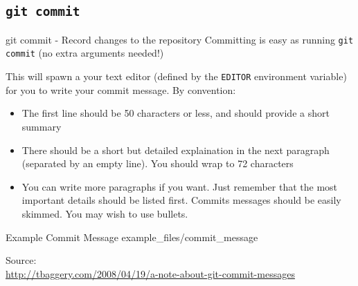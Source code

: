 \documentclass[aspectratio=43]{beamer}
\begin{document}
\subsection{\texttt{git commit}}

\begin{frame}{git commit - Record changes to the repository}
    Committing is easy as running \texttt{git commit} (no extra arguments
    needed!)

    This will spawn a your text editor (defined by the
    \texttt{\textdollar{}EDITOR} environment variable) for you to write your
    commit message. By convention:

    \begin{itemize}
    \item The first line should be 50 characters or less, and should
        provide a short summary
    \item There should be a short but detailed explaination in the next
        paragraph (separated by an empty line). You should wrap to 72
        characters
    \item You can write more paragraphs if you want. Just remember that
        the most important details should be listed first. Commits
        messages should be easily skimmed. You may wish to use bullets.
    \end{itemize}
\end{frame}

\begin{frame}{Example Commit Message}
        {example_files/commit_message}
    
    \begin{footnotesize}
    Source: \\
    \url{http://tbaggery.com/2008/04/19/a-note-about-git-commit-messages}
    \end{footnotesize}
\end{frame}
\end{document}
